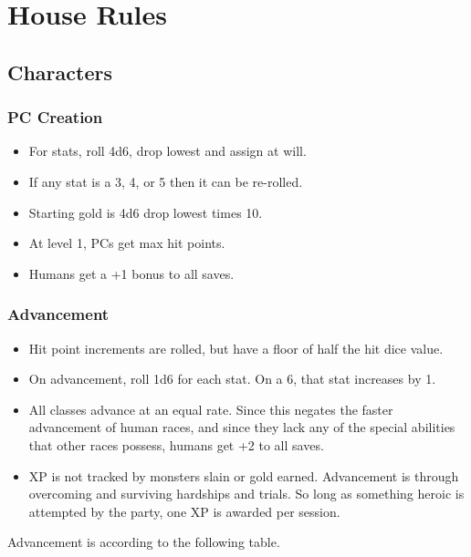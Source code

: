 \chapter{House Rules}
\section{Characters}

\subsection{PC Creation}
\begin{itemize}
      \item For stats, roll 4d6, drop lowest and assign at will.
      \item If any stat is a 3, 4, or 5 then it can be re-rolled.
      \item Starting gold is 4d6 drop lowest times 10.
      \item At level 1, PCs get max hit points.
      \item Humans get a +1 bonus to all saves.
\end{itemize}

\subsection{Advancement}
\begin{itemize}
      \item Hit point increments are rolled, but have a floor of half the hit
            dice value.
      \item On advancement, roll 1d6 for each stat. On a 6, that stat increases
            by 1.
      \item All classes advance at an equal rate. Since this negates the faster
            advancement of human races, and since they lack any of the special
            abilities that other races possess, humans get +2 to all saves.
      \item XP is not tracked by monsters slain or gold earned. Advancement is
            through overcoming and surviving hardships and trials. So long as
            something heroic is attempted by the party, one XP is awarded per
            session.
\end{itemize}
Advancement is according to the following table.



